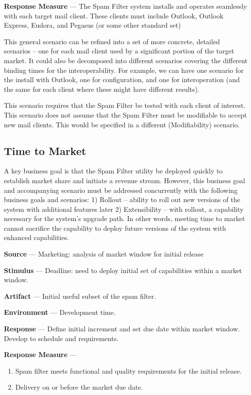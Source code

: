 \documentclass[11pt,letterpaper]{article}
\begin{document}
\textbf{Response Measure} --- The Spam Filter system installs and operates
seamlessly with each target mail client. These clients must include Outlook,
Outlook Express, Eudora, and Pegasus (or some other standard set)
 
This general scenario can be refined into a set of more concrete, detailed
scenarios – one for each mail client used by a significant portion of the
target market. It could also be decomposed into different scenarios covering
the different binding times for the interoperability. For example, we can have
one scenario for the install with Outlook, one for configuration, and one for
interoperation (and the same for each client where these might have different
results).
 
This scenario requires that the Spam Filter be tested with each client of
interest. This scenario does not assume that the Spam Filter must be
modifiable to accept new mail clients. This would be specified in a different
(Modifiability) scenario.

\subsection{Time to Market}
A key business goal is that the Spam Filter utility be deployed quickly to
establish market share and initiate a revenue stream. However, this business
goal and accompanying scenario must be addressed concurrently with the
following business goals and scenarios: 1) Rollout – ability to roll out new
versions of the system with additional features later 2) Extensibility – with
rollout, a capability necessary for the system’s upgrade path. In other words,
meeting time to market cannot sacrifice the capability to deploy future
versions of the system with enhanced capabilities.
 
\textbf{Source} --- Marketing: analysis of market window for initial release

\textbf{Stimulus} --- Deadline: need to deploy initial set of capabilities
within a market window.

\textbf{Artifact} --- Initial useful subset of the spam filter.  

\textbf{Environment} --- Development time. 

\textbf{Response} --- Define initial increment and set due date within market
window.  Develop to schedule and requirements.

\textbf{Response Measure} --- 
\begin{enumerate}
\item Spam filter meets functional and quality requirements for the initial
  release.
\item Delivery on or before the market due date.
\end{enumerate}
 
\end{document}
